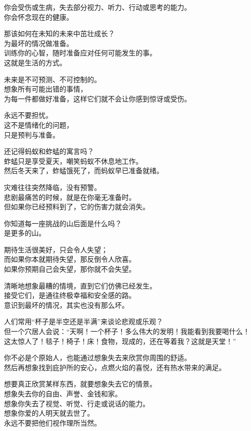 \documentclass[
]{article}
\begin{document}
你会受伤或生病，失去部分视力、听力、行动或思考的能力。\\
你会怀念现在的健康。

那该如何在未知的未来中茁壮成长？\\
为最坏的情况做准备。\\
训练你的心智，随时准备应对任何可能发生的事。\\
这就是生活的方式。

未来是不可预测、不可控制的。\\
想象所有可能出错的事情，\\
为每一件都做好准备，这样它们就不会让你感到惊讶或受伤。

永远不要担忧。\\
这不是情绪化的问题，\\
只是预判与准备。

还记得蚂蚁和蚱蜢的寓言吗？\\
蚱蜢只是享受夏天，嘲笑蚂蚁不休息地工作。\\
然后冬天来了，蚱蜢饿死了，而蚂蚁早已准备就绪。

灾难往往突然降临，没有预警。\\
悲剧最痛苦的时候，就是在你毫无准备时。\\
但如果你已经预料到了，它的伤害力就会消失。

你知道每一座挑战的山后面是什么吗？\\
是更多的山。

期待生活很美好，只会令人失望；\\
而如果你本就期待失望，那反倒令人欣喜。\\
如果你预期自己会失望，那你就不会失望。

清晰地想象最糟的情境，直到它们仿佛已经发生。\\
接受它们，是通往终极幸福和安全感的路。\\
意识到最坏的情况，其实也没有那么坏。

人们常用``杯子是半空还是半满''来谈论悲观或乐观？\\
但一个穴居人会说：``天啊！一个杯子！多么伟大的发明！我能看到我要喝什么！这太惊人了！毯子！椅子！床！食物，现成的，还在等着我？这就是天堂！''

你不必是个原始人，也能通过想象失去来欣赏你周围的舒适。\\
然后再想象找到庇护所的安心，点燃火焰的喜悦，还有热水带来的满足。

想要真正欣赏某样东西，就要想象失去它的情景。\\
想象失去你的自由、声誉、金钱和家。\\
想象你失去了视觉、听觉、行走或说话的能力。\\
想象你爱的人明天就去世了。\\
永远不要把他们视作理所当然。
\end{document}
